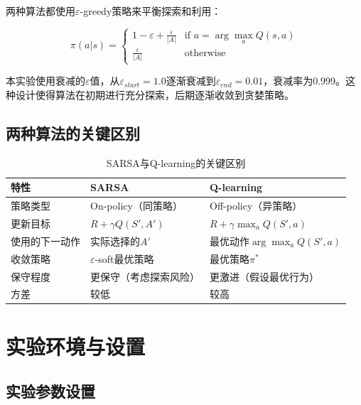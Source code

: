 \documentclass[12pt,a4paper]{article}
\begin{document}
两种算法都使用$\varepsilon$-greedy策略来平衡探索和利用：

\begin{equation}
\pi(a|s) = \begin{cases}
1 - \varepsilon + \frac{\varepsilon}{|A|} & \text{if } a = \arg\max_a Q(s,a) \\
\frac{\varepsilon}{|A|} & \text{otherwise}
\end{cases}
\end{equation}

本实验使用衰减的$\varepsilon$值，从$\varepsilon_{start}=1.0$逐渐衰减到$\varepsilon_{end}=0.01$，衰减率为0.999。这种设计使得算法在初期进行充分探索，后期逐渐收敛到贪婪策略。

\subsection{两种算法的关键区别}

\begin{table}[H]
\centering
\caption{SARSA与Q-learning的关键区别}
\begin{tabular}{p{3cm}p{5cm}p{5cm}}
\toprule
\textbf{特性} & \textbf{SARSA} & \textbf{Q-learning} \\
\midrule
策略类型 & On-policy（同策略） & Off-policy（异策略） \\
\midrule
更新目标 & $R + \gamma Q(S', A')$ & $R + \gamma \max_a Q(S', a)$ \\
\midrule
使用的下一动作 & 实际选择的$A'$ & 最优动作$\arg\max_a Q(S', a)$ \\
\midrule
收敛策略 & $\varepsilon$-soft最优策略 & 最优策略$\pi^*$ \\
\midrule
保守程度 & 更保守（考虑探索风险） & 更激进（假设最优行为） \\
\midrule
方差 & 较低 & 较高 \\
\bottomrule
\end{tabular}
\end{table}

\section{实验环境与设置}

\subsection{实验参数设置}
\end{document}
